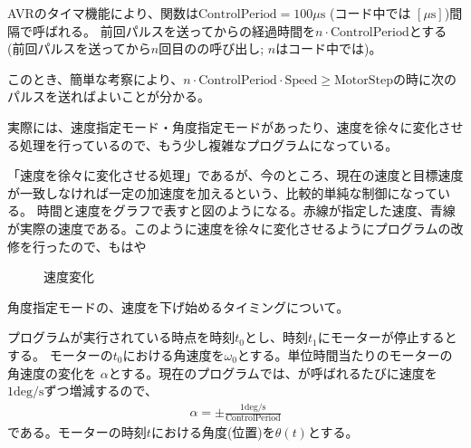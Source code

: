 \documentclass[letterpaper,10pt,dvipdfmx]{sphinxmanual}
\begin{document}
AVRのタイマ機能により、関数は\(\mathrm{ControlPeriod}=100 \mu\mathrm{s}\)
(コード中では \([\mu\mathrm{s}]\))間隔で呼ばれる。
前回パルスを送ってからの経過時間を\(n\cdot\mathrm{ControlPeriod}\)とする(前回パルスを送ってから\(n\)回目のの呼び出し;
\(n\)はコード中では)。

このとき、簡単な考察により、\(n\cdot\mathrm{ControlPeriod}\cdot\mathrm{Speed}\ge\mathrm{MotorStep}\)の時に次のパルスを送ればよいことが分かる。

実際には、速度指定モード・角度指定モードがあったり、速度を徐々に変化させる処理を行っているので、もう少し複雑なプログラムになっている。

「速度を徐々に変化させる処理」であるが、今のところ、現在の速度と目標速度が一致しなければ一定の加速度を加えるという、比較的単純な制御になっている。
時間と速度をグラフで表すと図のようになる。赤線が指定した速度、青線が実際の速度である。このように速度を徐々に変化させるようにプログラムの改修を行ったので、もはや
\begin{figure}[htbp]
\centering
\capstart

\noindent{}
\caption{速度変化}\label{\detokenize{nissyu-idohen/saitama:id13}}\end{figure}

角度指定モードの、速度を下げ始めるタイミングについて。

プログラムが実行されている時点を時刻\(t_0\)とし、時刻\(t_1\)にモーターが停止するとする。
モーターの\(t_0\)における角速度を\(\omega_0\)とする。単位時間当たりのモーターの角速度の変化を
\(\alpha\)とする。現在のプログラムでは、が呼ばれるたびに速度を\(1 \mathrm{deg/s}\)ずつ増減するので、
\begin{equation*}
\begin{split}\alpha=\pm\frac{1 \mathrm{deg/s}}{\mathrm{ControlPeriod}}\end{split}
\end{equation*}
である。モーターの時刻\(t\)における角度(位置)を\(\theta(t)\)とする。
\end{document}
